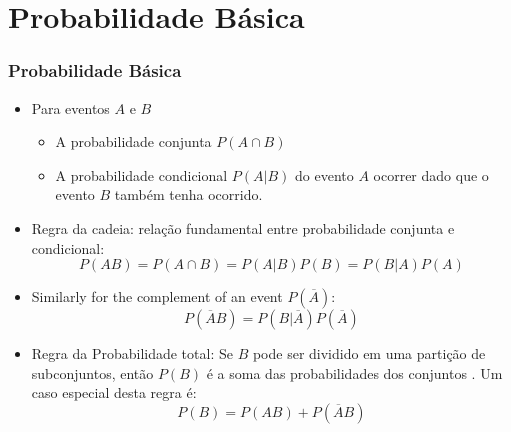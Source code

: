 \documentclass[compress]{beamer}
\def\myblue#1{\textcolor{texblue}{#1}}
\begin{document}
\section{Probabilidade Básica}
\begin{frame}[<+->]
\frametitle{Probabilidade Básica}
\pause[2]

\begin{itemize}
\item Para eventos $A$ e $B$
\begin{itemize}
\item A probabilidade conjunta $P(A \cap B)$   

\item A probabilidade condicional $P(A|B)$ do evento $A$ ocorrer dado que o evento $B$ também tenha ocorrido.
\end{itemize}

\item \myblue{Regra da cadeia}: relação fundamental entre probabilidade conjunta e condicional:
\begin{equation}
\nonumber
P(A B) = P(A \cap B) = P(A|B)P(B) = P(B|A)P(A) 
\end{equation}


\item Similarly for the  complement of an event $P(\overline{A})$:
\begin{equation}
\nonumber
P(\overline{A}B) = P(B| \overline{A})P(\overline{A})
\end{equation}

\item \myblue{Regra da Probabilidade total}: Se $B$ pode ser dividido em uma partição de subconjuntos, então $P(B)$ é a soma das probabilidades dos conjuntos .  Um caso especial desta regra é:
\begin{equation}
\nonumber
P(B) = P(AB) + P(\overline{A} B)
\end{equation}
\end{itemize}
\end{frame}
\end{document}
